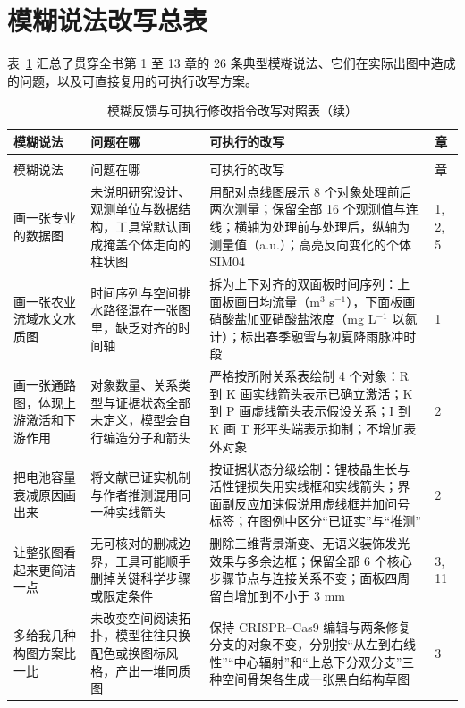 \section{模糊说法改写总表}

表~\ref{tab:app-b-rewrites} 汇总了贯穿全书第 1 至 13 章的 26 条典型模糊说法、它们在实际出图中造成的问题，以及可直接复用的可执行改写方案。

\begingroup\small
\begin{longtable}{@{}p{26mm}p{28mm}p{56mm}p{10mm}@{}}
\caption{模糊反馈与可执行修改指令改写对照表}\label{tab:app-b-rewrites}\\
\toprule
模糊说法 & 问题在哪 & 可执行的改写 & 章 \\
\midrule
\endfirsthead
\caption[]{模糊反馈与可执行修改指令改写对照表（续）}\\
\toprule
模糊说法 & 问题在哪 & 可执行的改写 & 章 \\
\midrule
\endhead
\bottomrule
\endfoot
画一张专业的数据图 & 未说明研究设计、观测单位与数据结构，工具常默认画成掩盖个体走向的柱状图 & 用配对点线图展示 8 个对象处理前后两次测量；保留全部 16 个观测值与连线；横轴为处理前与处理后，纵轴为测量值（a.u.）；高亮反向变化的个体 SIM04 & 1, 2, 5 \\
画一张农业流域水文水质图 & 时间序列与空间排水路径混在一张图里，缺乏对齐的时间轴 & 拆为上下对齐的双面板时间序列：上面板画日均流量（m$^3$ s$^{-1}$），下面板画硝酸盐加亚硝酸盐浓度（mg L$^{-1}$ 以氮计）；标出春季融雪与初夏降雨脉冲时段 & 1 \\
画一张通路图，体现上游激活和下游作用 & 对象数量、关系类型与证据状态全部未定义，模型会自行编造分子和箭头 & 严格按所附关系表绘制 4 个对象：R 到 K 画实线箭头表示已确立激活；K 到 P 画虚线箭头表示假设关系；I 到 K 画 T 形平头端表示抑制；不增加表外对象 & 2 \\
把电池容量衰减原因画出来 & 将文献已证实机制与作者推测混用同一种实线箭头 & 按证据状态分级绘制：锂枝晶生长与活性锂损失用实线框和实线箭头；界面副反应加速假说用虚线框并加问号标签；在图例中区分“已证实”与“推测” & 2 \\
让整张图看起来更简洁一点 & 无可核对的删减边界，工具可能顺手删掉关键科学步骤或限定条件 & 删除三维背景渐变、无语义装饰发光效果与多余边框；保留全部 6 个核心步骤节点与连接关系不变；面板四周留白增加到不小于 3 mm & 3, 11 \\
多给我几种构图方案比一比 & 未改变空间阅读拓扑，模型往往只换配色或换图标风格，产出一堆同质图 & 保持 CRISPR--Cas9 编辑与两条修复分支的对象不变，分别按“从左到右线性”“中心辐射”和“上总下分双分支”三种空间骨架各生成一张黑白结构草图 & 3 \\

\end{longtable}
